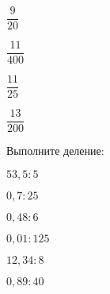 \begin{class}[number=5]
\begin{listofex}[resume]
\begin{enumcols}[itemcolumns=6]
			\item \( \dfrac{9}{20} \)
			\item \( \dfrac{11}{400} \)
			\item \( \dfrac{11}{25} \)
			\item \( \dfrac{13}{200} \)
		\end{enumcols}
		\item Выполните деление:
		\begin{enumcols}[itemcolumns=6]
			\item \( 53,5:5 \)
			\item \( 0,7:25 \)
			\item \( 0,48:6 \)
			\item \( 0,01:125 \)
			\item \( 12,34:8 \)
			\item \( 0,89:40 \)
		\end{enumcols}
	\end{listofex}
\end{class}
%
%
